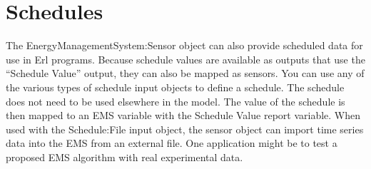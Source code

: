 \section{Schedules}\label{schedules-000}

The EnergyManagementSystem:Sensor object can also provide scheduled data for use in Erl programs. Because schedule values are available as outputs that use the ``Schedule Value'' output, they can also be mapped as sensors. You can use any of the various types of schedule input objects to define a schedule. The schedule does not need to be used elsewhere in the model. The value of the schedule is then mapped to an EMS variable with the Schedule Value report variable. When used with the Schedule:File input object, the sensor object can import time series data into the EMS from an external file. One application might be to test a proposed EMS algorithm with real experimental data.

